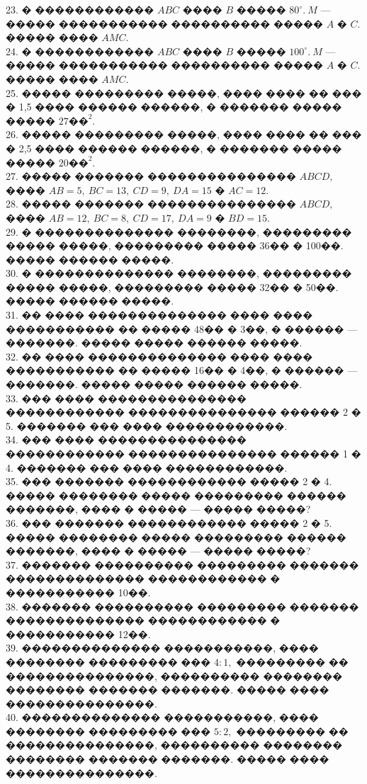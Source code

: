 \documentclass[12pt]{article}
\begin{document}
23. � ������������ $ABC$ ���� $B$ ����� $80^\circ.\ M$ --- ����� ����������� ���������� ����� $A$ � $C.$ ����� ���� $AMC.$\\
24. � ������������ $ABC$ ���� $B$ ����� $100^\circ.\ M$ --- ����� ����������� ���������� ����� $A$ � $C.$ ����� ���� $AMC.$\\
25. ����� ��������� �����, ���� ���� �� ��� � 1,5 ���� ������ ������, � ������� ����� ����� $27\text{��}^2.$\\
26. ����� ��������� �����, ���� ���� �� ��� � 2,5 ���� ������ ������, � ������� ����� ����� $20\text{��}^2.$\\
27. ����� ������� ��������������� $ABCD,$ ���� $AB=5,\ BC=13,\ CD=9,\ DA=15$ � $AC=12.$\\
28. ����� ������� ��������������� $ABCD,$ ���� $AB=12,\ BC=8,\ CD=17,\ DA=9$ � $BD=15.$\\
29. � �������������� ��������, ���������  ����� �����, ��������� ����� 36�� � 100��. ����� ������ �����.\\
30. � �������������� ��������, ���������  ����� �����, ��������� ����� 32�� � 50��. ����� ������ �����.\\
31. �� ���� �������������� ���� ���� ����������� �� ����� 48�� � 3��, � ������ --- �������. ����� ����� ������ �����.\\
32. �� ���� �������������� ���� ���� ����������� �� ����� 16�� � 4��, � ������ --- �������. ����� ����� ������ �����.\\
33. ��� ���� ��������������� ������������ ��������������� ������ 2 � 5. ������� ��� ���� ������������.\\
34. ��� ���� ��������������� ������������ ��������������� ������ 1 � 4. ������� ��� ���� ������������.\\
35. ��� ������� ������������ ����� 2 � 4. ����� �������� ����� ��������� ������ �������, ���� � ����� --- ����� �����?\\
36. ��� ������� ������������ ����� 2 � 5. ����� �������� ����� ��������� ������ �������, ���� � ����� --- ����� �����?\\
37. ������� ���������� ��������� ������� �������������� ������������ � ����������� 10��.\\
38. ������� ���������� ��������� ������� �������������� ������������ � ����������� 12��.\\
39. �������������� �����������, ���� �������� ��������� ��� $4:1,$ ��������� �� ���������������, ���������� �������� �������� ������� �������. ����� ���� ���������������.\\
40. �������������� �����������, ���� �������� ��������� ��� $5:2,$ ��������� �� ���������������, ���������� �������� �������� ������� �������. ����� ���� ���������������.\\
\end{document}
